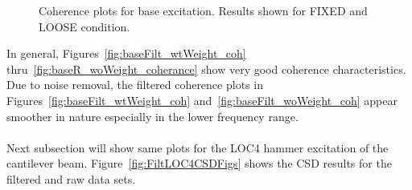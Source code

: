 \documentclass[paper=a4, fontsize=12pt]{scrartcl} %
\begin{document}
	\begin{figure}[H]
		\centering
		\quad
		\caption{Coherence plots for base excitation. Results shown for FIXED and LOOSE condition.}
		\label{fig:baseCohFigs2}
	\end{figure}
%
In general, Figures~\ref{fig:baseFilt_wtWeight_coh} thru~\ref{fig:baseR_woWeight_coherance} show very good coherence characteristics. Due to noise removal, the filtered coherence plots in Figures~\ref{fig:baseFilt_wtWeight_coh} and~\ref{fig:baseFilt_woWeight_coh} appear smoother in nature especially in the lower frequency range.
\\
\\
Next subsection will show same plots for the LOC4 hammer excitation of the cantilever beam. Figure~\ref{fig:FiltLOC4CSDFigs} shows the CSD results for the filtered and raw data sets.
%
\end{document}
